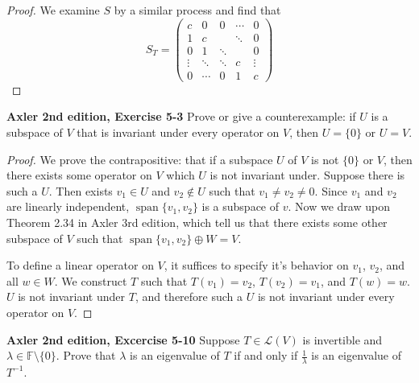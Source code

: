 \documentclass{article}
\newcommand{\F}{\mathbb{F}}
\DeclareMathOperator{\spann}{span}
\begin{document}
\begin{proof}
    We examine $S$ by a similar process and find that
    $$S_T = \begin{pmatrix}
        c & 0 & 0 & \cdots & 0\\
        1 & c & & \ddots & 0  \\
        0 & 1 &  \ddots & & 0 \\
        \vdots & \ddots  & \ddots & c & \vdots \\
        0 & \cdots & 0 & 1 & c
    \end{pmatrix}$$   
\end{proof}


\textbf{Axler 2nd edition, Exercise 5-3} %
Prove or give a counterexample: if $U$ is a subspace of $V$ that is invariant under every operator on $V$, then $U = \{0\}$ or $U = V$.

\begin{proof}
    We prove the contrapositive: that if a subspace $U$ of $V$ is not $\{0\}$ or $V$, then there exists some operator on $V$ which $U$ is not invariant under. Suppose there is such a $U$. Then exists $v_1 \in U$ and $v_2 \notin U$ such that $v_1 \ne v_2 \ne 0$. Since $v_1$ and $v_2$ are linearly independent, $\spann\{v_1, v_2\}$ is a subspace of $v$. Now we draw upon Theorem 2.34 in Axler 3rd edition, which tell us that there exists some other subspace of $V$ such that $\spann\{v_1, v_2\} \oplus W = V$.
    
    To define a linear operator on $V$, it suffices to specify it's behavior on $v_1$, $v_2$, and all $w \in W$. We construct $T$ such that $T(v_1) = v_2$, $T(v_2) = v_1$, and $T(w) = w$. $U$ is not invariant under $T$, and therefore such a $U$ is not invariant under every operator on $V$.
\end{proof}


\textbf{Axler 2nd edition, Excercise 5-10} Suppose $T \in \mathcal{L} (V)$ is invertible and $\lambda \in \F \setminus \{0\}$. Prove that $\lambda$ is an eigenvalue of $T$ if and only if $\frac{1}{\lambda}$ is an eigenvalue of $T^{-1}$.
\end{document}

